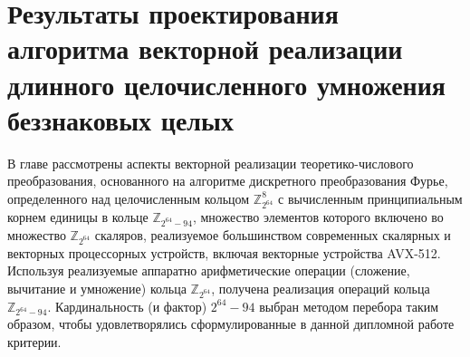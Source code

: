 \section{Результаты проектирования алгоритма векторной реализации длинного целочисленного умножения беззнаковых целых}
В главе рассмотрены аспекты векторной реализации теоретико-числового преобразования, основанного на алгоритме дискретного преобразования Фурье, определенного над целочисленным кольцом $\mathbb{Z}_{2^{64}}^8$ с вычисленным принципиальным корнем единицы в кольце $\mathbb{Z}_{2^{64}-94}$, множество элементов которого включено во множество $\mathbb{Z}_{2^{64}}$ скаляров, реализуемое большинством современных скалярных и векторных процессорных устройств, включая векторные устройства AVX-512.
Используя реализуемые аппаратно арифметические операции (сложение, вычитание и умножение) кольца $\mathbb{Z}_{2^{64}}$, получена реализация операций кольца $\mathbb{Z}_{2^{64}-94}$.
Кардинальность (и фактор) $2^{64}-94$ выбран методом перебора таким образом, чтобы удовлетворялись сформулированные в данной дипломной работе критерии.

